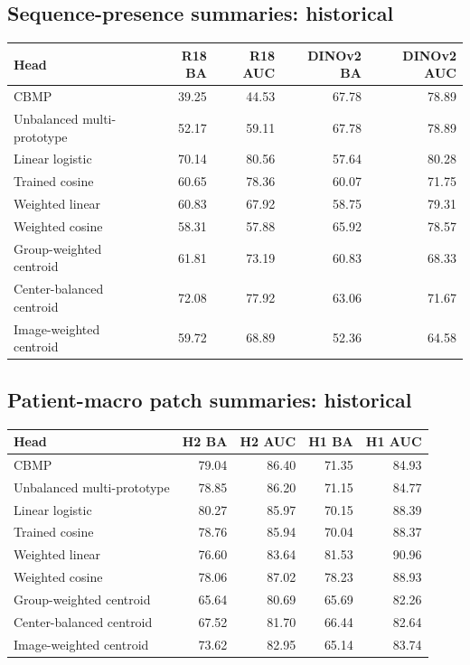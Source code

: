 \subsection*{Sequence-presence summaries: historical}
\begingroup\small\setlength{\tabcolsep}{4pt}
\begin{longtable}{lrrrr}
\toprule
Head & R18 BA & R18 AUC & DINOv2 BA & DINOv2 AUC \\ \midrule
CBMP & 39.25 & 44.53 & 67.78 & 78.89 \\
Unbalanced multi-prototype & 52.17 & 59.11 & 67.78 & 78.89 \\
Linear logistic & 70.14 & 80.56 & 57.64 & 80.28 \\
Trained cosine & 60.65 & 78.36 & 60.07 & 71.75 \\
Weighted linear & 60.83 & 67.92 & 58.75 & 79.31 \\
Weighted cosine & 58.31 & 57.88 & 65.92 & 78.57 \\
Group-weighted centroid & 61.81 & 73.19 & 60.83 & 68.33 \\
Center-balanced centroid & 72.08 & 77.92 & 63.06 & 71.67 \\
Image-weighted centroid & 59.72 & 68.89 & 52.36 & 64.58 \\
\bottomrule\end{longtable}\endgroup

\subsection*{Patient-macro patch summaries: historical}
\begingroup\small\setlength{\tabcolsep}{4pt}
\begin{longtable}{lrrrr}
\toprule
Head & H2 BA & H2 AUC & H1 BA & H1 AUC \\ \midrule
CBMP & 79.04 & 86.40 & 71.35 & 84.93 \\
Unbalanced multi-prototype & 78.85 & 86.20 & 71.15 & 84.77 \\
Linear logistic & 80.27 & 85.97 & 70.15 & 88.39 \\
Trained cosine & 78.76 & 85.94 & 70.04 & 88.37 \\
Weighted linear & 76.60 & 83.64 & 81.53 & 90.96 \\
Weighted cosine & 78.06 & 87.02 & 78.23 & 88.93 \\
Group-weighted centroid & 65.64 & 80.69 & 65.69 & 82.26 \\
Center-balanced centroid & 67.52 & 81.70 & 66.44 & 82.64 \\
Image-weighted centroid & 73.62 & 82.95 & 65.14 & 83.74 \\
\bottomrule\end{longtable}\endgroup


